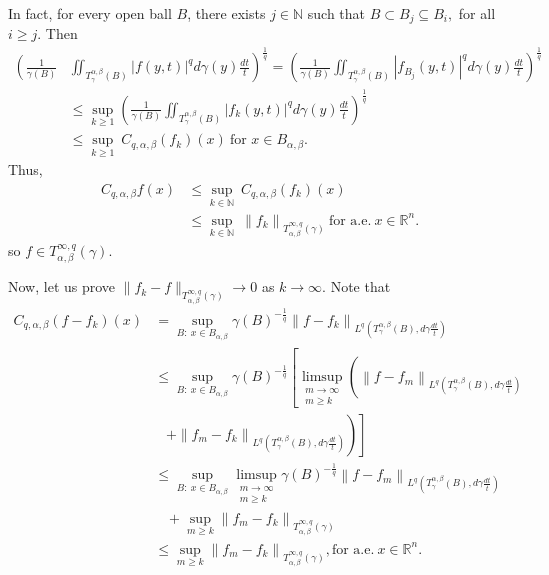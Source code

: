 \documentclass[leqno,11pt]{amsart}
\theoremstyle{plain}
\theoremstyle{remark}
\begin{document}
{{{ In fact, for every open ball $B$, there exists $j\in {\mathbb N}$ such that $B\subset B_j\subseteq B_i,$ for all $i\ge j.$ Then
\begin{align*}
\left(\frac{1}{\gamma(B)} \right. & \left.\iint_{T^{\alpha, \beta}_\gamma(B)}|f(y, t)|^q d\gamma(y) \frac{dt}{t}\right)^{\frac{1}{q}} = \left(\frac{1}{\gamma(B)} \iint_{T^{\alpha, \beta}_\gamma(B)}|f_{B_j}(y, t)|^q d\gamma(y) \frac{dt}{t}\right)^{\frac{1}{q}}\\ &\leq \sup _{k \geq 1}\left(\frac{1}{\gamma(B)} \iint_{T^{\alpha, \beta}_\gamma(B)}\left|f_k(y, t)\right|^q d\gamma(y) \frac{d t}{t}\right)^{\frac{1}{q}}\\ & \leq \sup _{k \geq 1}\ C_{q,\alpha, \beta}(f_k) (x) \ \text{for\ } x\in B_{\alpha, \beta}.
\end{align*}
Thus, \begin{align*}
C_{q,\alpha, \beta}f(x)&\le \sup_{k\in {\mathbb N}}\ C_{q,\alpha, \beta}(f_k)(x) \\ &\le \sup_{k\in {\mathbb N}}\ \left\|f_k\right\|_{T_{\alpha, \beta}^{\infty,q}(\gamma)}\ \text{for a.e.}\ x\in \mathbb{R}^n.
\end{align*}
so $f \in T_{\alpha, \beta}^{\infty,q}(\gamma)$.

Now, let us prove $\|f_k-f\|_{T^{\infty, q}_{\alpha, \beta}(\gamma)}\to 0$ as $k\to \infty.$ 
Note that
\begin{align*}
C_{q,\alpha, \beta}(f-f_k)(x)& = \sup _{B:\ x\in B_{\alpha, \beta}} \gamma(B)^{-\frac{1}{q}}\left\|f-f_k\right\|_{L^q\left(T^{\alpha, \beta}_\gamma(B) , d \gamma \frac{dt}{t}\right)} \\
& \leq \sup _{B:\ x\in B_{\alpha, \beta}} \gamma(B)^{-\frac{1}{q}}\left[\limsup _{\substack{m \rightarrow \infty \\
m \geq k}}\left(\left\|f-f_m\right\|_{L^q\left(T^{\alpha, \beta}_\gamma(B) , d \gamma \frac{dt}{t}\right)} \right. \right.\\
& \;\;\; \left. \left. +\left\|f_m-f_k\right\|_{L^q\left(T^{\alpha, \beta}_\gamma(B) , d \gamma \frac{dt}{t}\right)}\right)\right] \\
& \leq \sup _{B:\ x\in B_{\alpha, \beta}} \limsup _{\substack{m \rightarrow \infty \\
m \geq k}} \gamma(B)^{-\frac{1}{q}}\left\|f-f_m\right\|_{L^q\left(T^{\alpha, \beta}_\gamma(B) , d \gamma \frac{dt}{t}\right)}\\
& \;\;\;  +\sup _{m \geq k}\left\|f_m-f_k\right\|_{T_{\alpha, \beta}^{\infty,q}(\gamma)}\\
& \leq \sup _{m \geq k}\left\|f_m-f_k\right\|_{T_{\alpha, \beta}^{\infty,q}(\gamma)}, \text{for a.e.}\ x\in \mathbb{R}^n.
\end{align*}

}}}
\end{document}

